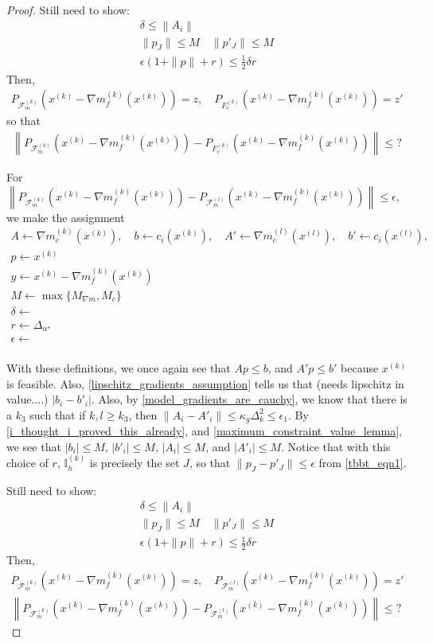 \documentclass{article}
\theoremstyle{case}
\numberwithin{theorem}{subsection}
\newcommand{\dk}{\Delta_k}
\newcommand{\feasiblek}{{\mathcal F_m^{(k)}}}
\newcommand{\feasiblel}{{\mathcal F_m^{(l)}}}
\newcommand{\gk}{{\nabla m_f^{(k)}\left(\xk\right)}}
\newcommand{\minangledelta}{{\Delta_{\alpha^{\star}}}}
\newcommand{\xk}{x^{(k)}}
\newcommand{\xl}{{x^{(l)}}}
\newcommand{\truefeasiblek}{{F_c^{(k)}}}
\newcommand{\maxmodelgrad}{{M_{\nabla m}}}
\newcommand{\activeindicesk}{{ \mathbb I_h^{(k)} }}
\newcommand{\modeljack}{{ \nabla m^{(k)}_{c}\left(\xk\right) }}
\newcommand{\modeljacl}{{ \nabla m^{(l)}_{c}\left(\xl\right) }}
\begin{document}
\begin{proof}
\color{red}
Still need to show:
\begin{align*}
\delta \le \left\|A_i\right\| \\
\|p_J\| \le M \quad \|p'_J\| \le M \\
\epsilon\left(1 + \|p\| + r\right) \le \frac 1 2 \delta r
\end{align*}
\color{black}
Then, 
\begin{align*}
P_{\feasiblek}\left(\xk - \gk\right) = z, \quad
P_{\truefeasiblek}\left(\xk - \gk\right) = z'
\end{align*}
so that
\begin{align*}
\left\|P_{\feasiblek}\left(\xk - \gk\right) - P_{\truefeasiblek}\left(\xk - \gk\right) \right\| \le ?
\end{align*}


For 
$\left\| P_{\feasiblek}\left(\xk - \gk\right) - P_{\feasiblel}\left(\xk - \gk\right) \right\| \le \epsilon$,
we make the assignment
\begin{align*}
A			\gets \modeljack, \quad
b			\gets c_i\left(\xk\right), \quad
A'			\gets \modeljacl, \quad
b'			\gets c_i\left(\xl\right), \\
p			\gets \xk \\
y			\gets \xk - \gk \\
M			\gets \max\{\maxmodelgrad, M_c\}\\
\delta		\gets \\
r			\gets \minangledelta \\
\epsilon	\gets \\
\end{align*}

With these definitions, we once again see that $Ap \le b$, and $A'p \le b'$ because $\xk$ is feasible.
\color{red}
Also, \cref{lipschitz_gradients_assumption} tells us that (needs lipschitz in value....)
$|b_i - b'_i|$.
\color{black}
Also, by \cref{model_gradients_are_cauchy}, we know that there is a $k_3$ such that if $k, l \ge k_3$, then $\left\|A_i - A'_i \right\| \le \kappa_g \dk^2 \le \epsilon_1$.
By \cref{i_thought_i_proved_this_already}, and \cref{maximum_constraint_value_lemma}, we see that
$\left|b_i\right| \le M $, $\left|b'_i\right| \le M$,
$\left|A_i\right| \le M $, and $\left|A'_i\right| \le M$.
Notice that with this choice of $r$, $\activeindicesk$ is precisely the set $J$,
so that $\|p_J - p'_J\| \le \epsilon$ from \cref{tbbt_eqn1}.

\color{red}
Still need to show:
\begin{align*}
\delta \le \left\|A_i\right\| \\
\|p_J\| \le M \quad \|p'_J\| \le M \\
\epsilon\left(1 + \|p\| + r\right) \le \frac 1 2 \delta r
\end{align*}
\color{black}
Then, 
\begin{align*}
P_{\feasiblek}\left(\xk - \gk\right) = z, \quad
P_{\feasiblel}\left(\xk - \gk\right) = z' \\
\left\|P_{\feasiblek}\left(\xk - \gk\right) - P_{\feasiblel}\left(\xk - \gk\right) \right\| \le ?
\end{align*}

\end{proof}
\end{document}

